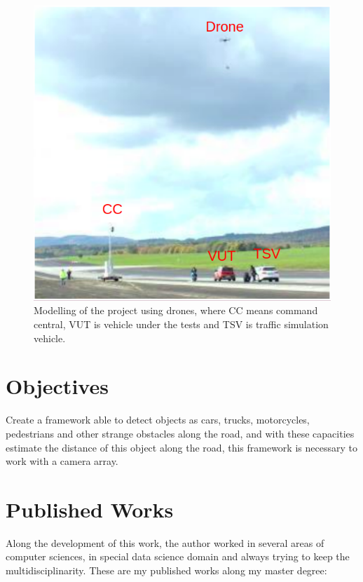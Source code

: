 \begin{figure}[H]
\centering
\includegraphics[scale=0.6]{imagens/proposal.png}
\caption{Modelling of the project using drones, where CC means command central, VUT is vehicle under the tests and TSV is traffic simulation vehicle.}
\label{fig:tests}
\end{figure}

\section{Objectives}

Create a framework able to detect objects as cars, trucks, motorcycles, pedestrians and other strange obstacles along the road, and with these capacities estimate the distance of this object along the road, this framework is necessary to work with a camera array.

\section{Published Works}

Along the development of this work, the author worked in several areas of computer sciences, in special data science domain and always trying to keep the 
multidisciplinarity. These are my published works along my master degree:

